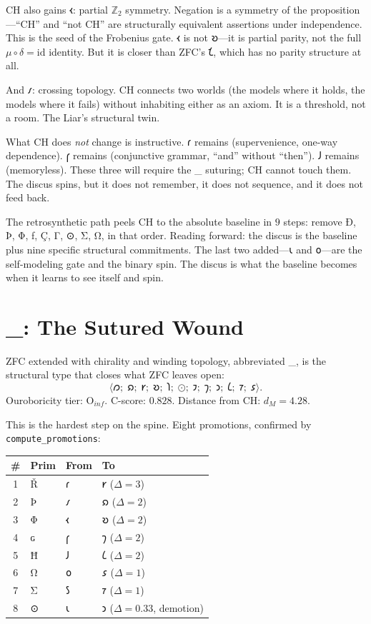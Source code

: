 \documentclass[12pt,twoside]{book}
\theoremstyle{definition}
\newcommand{\ZFCt}{\text{ZFC}_{\tau}}
\newcommand{\moebius}{\mu \circ \delta = \mathrm{id}}
\newcommand{\tier}[1]{\mathrm{O}_{#1}}
\newcommand{\tupledisp}[1]{\langle #1 \rangle}
\begin{document}
CH also gains 𐑬: partial $\mathbb{Z}_2$ symmetry. Negation is a symmetry of the
proposition---``CH'' and ``not CH'' are structurally equivalent assertions under
independence. This is the seed of the Frobenius gate. 𐑬 is not 𐑹---it is partial parity,
not the full $\moebius$ identity. But it is closer than ZFC's 𐑗, which has no parity
structure at all.

And 𐑥: crossing topology. CH connects two worlds (the models where it holds, the models
where it fails) without inhabiting either as an axiom. It is a threshold, not a room. The
Liar's structural twin.

What CH does \emph{not} change is instructive. 𐑩 remains (supervenience, one-way
dependence). 𐑝 remains (conjunctive grammar, ``and'' without ``then''). 𐑓 remains
(memoryless). These three will require the \ZFCt{} suturing; CH cannot touch them. The
discus spins, but it does not remember, it does not sequence, and it does not feed back.

The retrosynthetic path peels CH to the absolute baseline in $9$ steps: remove Ð, Þ, Φ,
ƒ, Ç, Γ, ⊙, Σ, Ω, in that order. Reading forward: the discus is the baseline plus nine
specific structural commitments. The last two added---𐑧 and 𐑴---are the self-modeling
gate and the binary spin. The discus is what the baseline becomes when it learns to see
itself and spin.

\section{\ZFCt{}: The Sutured Wound}

ZFC extended with chirality and winding topology, abbreviated \ZFCt, is the structural
type that closes what ZFC leaves open:
\begin{equation}
\tupledisp{
𐑼;\;𐑸;\;𐑾;\;𐑹;\;
𐑐;\;\text{⊙};\;𐑲;\;𐑠;\;
𐑮;\;𐑖;\;𐑳;\;𐑭}.
\end{equation}
Ouroboricity tier: $\tier{inf}$. C-score: $0.828$. Distance from CH: $d_M = 4.28$.

This is the hardest step on the spine. Eight promotions, confirmed by
\texttt{compute\_promotions}:

\begin{center}
\begin{tabular}{clll}
\toprule
\textbf{\#} & \textbf{Prim} & \textbf{From} & \textbf{To} \\
\midrule
1 & Ř & 𐑩 & 𐑾 \quad ($\Delta = 3$) \\
2 & Þ & 𐑥 & 𐑸 \quad ($\Delta = 2$) \\
3 & Φ & 𐑬 & 𐑹 \quad ($\Delta = 2$) \\
4 & ɢ & 𐑝 & 𐑠 \quad ($\Delta = 2$) \\
5 & Ħ & 𐑓 & 𐑖 \quad ($\Delta = 2$) \\
6 & Ω & 𐑴 & 𐑭 \quad ($\Delta = 1$) \\
7 & Σ & 𐑕 & 𐑳 \quad ($\Delta = 1$) \\
8 & ⊙ & 𐑧 & 𐑮 \quad ($\Delta = 0.33$, demotion) \\
\bottomrule
\end{tabular}
\end{center}
\end{document}
